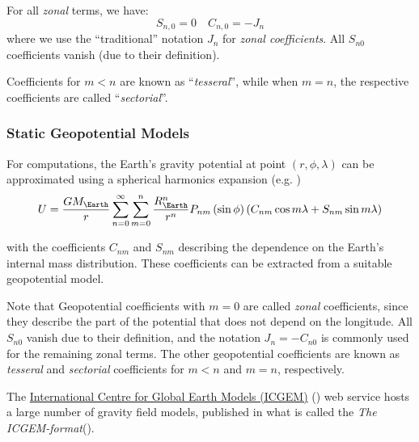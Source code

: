 For all \emph{zonal} terms, we have:
\begin{equation}
  S_{n,0} = 0 \quad C_{n,0} = -J_n
\end{equation}
where we use the ``traditional'' notation $J_n$ for \emph{zonal coefficients}. 
All $S_{n0}$ coefficients vanish (due to their definition).

Coefficients for $m<n$ are known as ``\emph{tesseral}'', while when $m=n$, the 
respective coefficients are called ``\emph{sectorial}''.


\subsubsection{Static Geopotential Models}
For computations, the Earth's gravity potential at point $(r, \phi , \lambda )$
can be approximated using a spherical harmonics expansion 
(e.g. \cite{Montenbruck2000})
\begin{equation}
    U = \frac{G M_{\Earth}}{r} \sum_{n=0}^\infty \sum_{m=0}^n 
    \frac{R_{\Earth}^n}{r^n} P_{nm} \left( \sin \phi \right) 
    \left( C_{nm} \cos{m\lambda} + S_{nm} \sin{m\lambda} \right)
\end{equation}

with the coefficients \(C_{nm}\) and \(S_{nm}\) describing the dependence on the 
Earth's internal mass distribution. These coefficients can be extracted from a 
suitable geopotential model.

Note that Geopotential coefficients with \(m=0\) are called  \emph{zonal} coefficients, 
since they describe the part of the potential that does not depend on the longitude. 
All \(S_{n0}\) vanish due to their definition, and the notation \(J_n = -C_{n0}\) 
is commonly used for the remaining zonal terms. The other geopotential coefficients
are known as \emph{tesseral} and \emph{sectorial} coefficients for \(m<n\) and 
\(m = n\), respectively.


The \href{http://icgem.gfz-potsdam.de/home}{International Centre for Global Earth Models (ICGEM)}  
(\cite{icgempub}) web service hosts a large number of gravity field models, 
published in what is called the \emph{The ICGEM-format}(\cite{ICGEMFormat}). 

